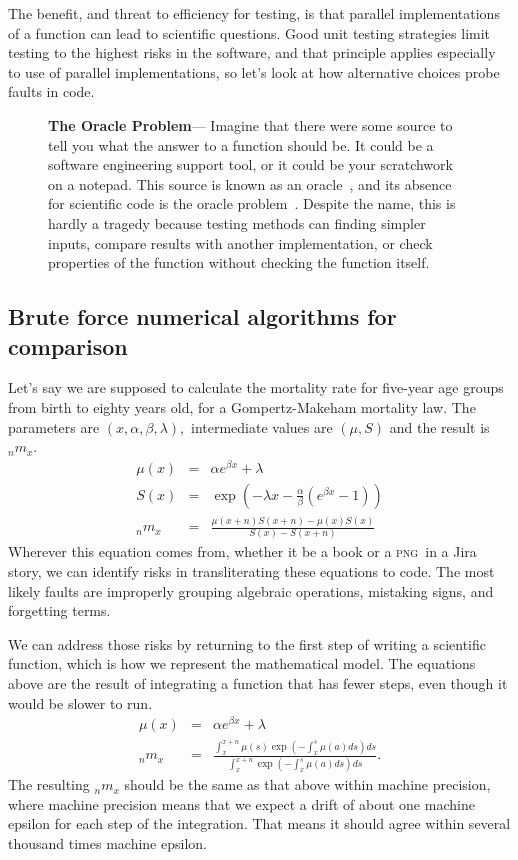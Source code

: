 \documentclass[fleqn,10pt]{olplainarticle}
\newenvironment{callout}
{
\begin{figure}
\begin{center}
\begin{minipage}{0.9\textwidth}
\begin{framed}
}
{
\end{framed}
\end{minipage}
\end{center}
\end{figure}
}
\begin{document}
The benefit, and threat to efficiency for testing, is that
parallel implementations of a function can lead to scientific
questions. Good unit testing strategies limit testing to the
highest risks in the software, and that principle applies
especially to use of parallel implementations, so let's
look at how alternative choices probe faults in code.

\begin{callout}
\textbf{The Oracle Problem}---
Imagine that there were some source to tell you what the answer to a function
should be. It could be a software engineering support tool, or it could
be your scratchwork on a notepad. This source is known as an
oracle~\citep{howden1986functional}, and its absence for scientific code
is the oracle problem~\citep{sirer1999using}. Despite the name, this
is hardly a tragedy because testing methods can 
finding simpler inputs, compare results with another implementation,
or check properties of the function without checking the function itself.
\end{callout}


\subsection{Brute force numerical algorithms for comparison}

Let's say we are supposed to calculate the mortality rate
for five-year age groups from birth to eighty years old,
for a Gompertz-Makeham mortality law. The parameters are
$(x, \alpha, \beta, \lambda),$ intermediate values are $(\mu, S)$ and the result is ${}_nm_x$.
\begin{eqnarray}
  \mu(x) & =&  \alpha e^{\beta x} + \lambda \\
  S(x) & = & \exp\left(-\lambda x - \frac{\alpha}{\beta}\left(e^{\beta x} - 1\right)\right) \\
  {}_nm_x & = & \frac{\mu(x+n) S(x+n) - \mu(x)S(x)}{S(x) - S(x+n)}
\end{eqnarray}
Wherever this equation comes from, whether it be a book or a
\textsc{png}\ in a Jira story, we can identify risks in transliterating
these equations to code. The most likely faults are improperly grouping
algebraic operations, mistaking signs, and forgetting terms. 

We can address those risks by returning to the first step of writing
a scientific function, which is how we represent the mathematical model.
The equations above are the result of integrating a function that has fewer
steps, even though it would be slower to run.
\begin{eqnarray}
  \mu(x) & =&  \alpha e^{\beta x} + \lambda \\
  {}_nm_x & = &\frac{\int_{x}^{x+n}\mu(s) \exp(-\int_{x}^s\mu(a)ds)ds}{\int_{x}^{x+n}\exp(-\int_{x}^s\mu(a)ds)ds}.
\end{eqnarray}
The resulting ${}_nm_x$ should be the same as that above within
machine precision, where machine precision means that we expect a drift
of about one machine epsilon for each step of the integration. That means
it should agree within several thousand times machine epsilon.
\end{document}
